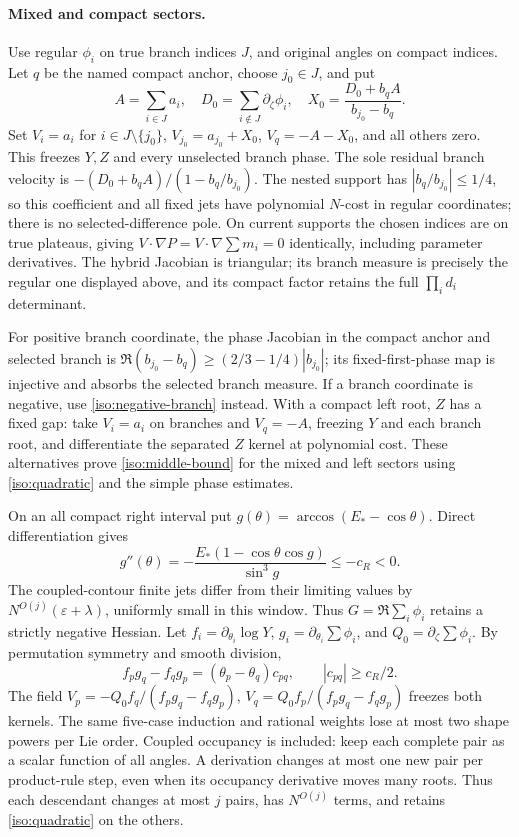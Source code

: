 \documentclass[11pt]{article}
\numberwithin{equation}{section}
\theoremstyle{definition}
\newcommand{\eps}{\varepsilon}
\begin{document}
\paragraph{Mixed and compact sectors.}
Use regular $\phi_i$ on true branch indices $J$, and original angles
on compact indices. Let $q$ be the named compact anchor, choose
$j_0\in J$, and put
\[
 A=\sum_{i\in J}a_i,\quad D_0=\sum_{i\notin J}\partial_\zeta\phi_i,
 \quad X_0=\frac{D_0+b_qA}{b_{j_0}-b_q}.
\]
Set $V_i=a_i$ for $i\in J\setminus\{j_0\}$,
$V_{j_0}=a_{j_0}+X_0$, $V_q=-A-X_0$, and all others zero.
This freezes $Y,Z$ and every unselected branch phase. The sole residual
branch velocity is
$-(D_0+b_qA)/(1-b_q/b_{j_0})$.
The nested support has $|b_q/b_{j_0}|\le1/4$, so this coefficient and
all fixed jets have polynomial $N$-cost in regular coordinates; there
is no selected-difference pole. On current supports the chosen indices
are on true plateaus, giving $V\cdot\nabla P=V\cdot\nabla\sum m_i=0$
identically, including parameter derivatives. The hybrid Jacobian is
triangular; its branch measure is precisely the regular one displayed
above, and its compact factor retains the full $\prod_i d_i$ determinant.

For positive branch coordinate, the phase Jacobian in the compact
anchor and selected branch is
$\Re(b_{j_0}-b_q)\ge(2/3-1/4)|b_{j_0}|$; its fixed-first-phase map is
injective and absorbs the selected branch measure. If a branch
coordinate is negative, use \eqref{iso:negative-branch} instead.
With a compact left root, $Z$ has a fixed gap: take $V_i=a_i$ on
branches and $V_q=-A$, freezing $Y$ and each branch root, and
differentiate the separated $Z$ kernel at polynomial cost.
These alternatives prove \eqref{iso:middle-bound} for the mixed and
left sectors using \eqref{iso:quadratic} and the simple phase estimates.

On an all compact right interval put
$g(\theta)=\arccos(E_*-\cos\theta)$. Direct differentiation gives
\[
 g''(\theta)=-\frac{E_*(1-\cos\theta\cos g)}{\sin^3g}\le-c_R<0.
\]
The coupled-contour finite jets differ from their limiting values by
$N^{O(j)}(\eps+\lambda)$, uniformly small in this window. Thus
$G=\Re\sum_i\phi_i$ retains a strictly negative Hessian.
Let $f_i=\partial_{\theta_i}\log Y$,
$g_i=\partial_{\theta_i}\sum\phi_i$, and
$Q_0=\partial_\zeta\sum\phi_i$. By permutation symmetry and smooth
division,
\[
 f_pg_q-f_qg_p=(\theta_p-\theta_q)c_{pq},\qquad|c_{pq}|\ge c_R/2.
\]
The field $V_p=-Q_0f_q/(f_pg_q-f_qg_p)$,
$V_q=Q_0f_p/(f_pg_q-f_qg_p)$ freezes both kernels. The same
five-case induction and rational weights lose at most two shape powers
per Lie order. Coupled occupancy is included: keep each complete pair
as a scalar function of all angles. A derivation changes at most one
new pair per product-rule step, even when its occupancy derivative
moves many roots. Thus each descendant changes at most $j$ pairs,
has $N^{O(j)}$ terms, and retains \eqref{iso:quadratic} on the others.
\end{document}
